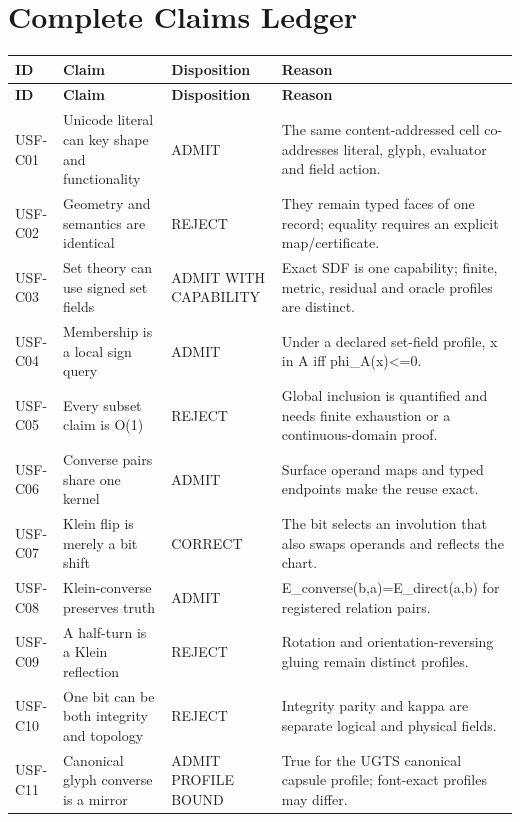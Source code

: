 \documentclass[11pt,a4paper]{article}
\begin{document}
\section{Complete Claims Ledger}
\scriptsize
{}
\begin{longtable}{P{14mm}P{42mm}P{27mm}P{72mm}}
\toprule
\textbf{ID} & \textbf{Claim} & \textbf{Disposition} & \textbf{Reason}\\
\midrule
\endfirsthead
\toprule
\textbf{ID} & \textbf{Claim} & \textbf{Disposition} & \textbf{Reason}\\
\midrule
\endhead
\bottomrule
\endlastfoot
USF-C01 & Unicode literal can key shape and functionality & ADMIT & The same content-addressed cell co-addresses literal, glyph, evaluator and field action. \\
USF-C02 & Geometry and semantics are identical & REJECT & They remain typed faces of one record; equality requires an explicit map/certificate. \\
USF-C03 & Set theory can use signed set fields & ADMIT WITH CAPABILITY & Exact SDF is one capability; finite, metric, residual and oracle profiles are distinct. \\
USF-C04 & Membership is a local sign query & ADMIT & Under a declared set-field profile, x in A iff phi\_A(x)\textless{}=0. \\
USF-C05 & Every subset claim is O(1) & REJECT & Global inclusion is quantified and needs finite exhaustion or a continuous-domain proof. \\
USF-C06 & Converse pairs share one kernel & ADMIT & Surface operand maps and typed endpoints make the reuse exact. \\
USF-C07 & Klein flip is merely a bit shift & CORRECT & The bit selects an involution that also swaps operands and reflects the chart. \\
USF-C08 & Klein-converse preserves truth & ADMIT & E\_converse(b,a)=E\_direct(a,b) for registered relation pairs. \\
USF-C09 & A half-turn is a Klein reflection & REJECT & Rotation and orientation-reversing gluing remain distinct profiles. \\
USF-C10 & One bit can be both integrity and topology & REJECT & Integrity parity and kappa are separate logical and physical fields. \\
USF-C11 & Canonical glyph converse is a mirror & ADMIT PROFILE BOUND & True for the UGTS canonical capsule profile; font-exact profiles may differ. \\

\end{longtable}
\end{document}
